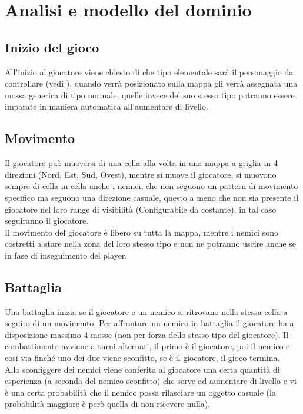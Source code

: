 \documentclass[a4paper,12pt]{report}
\begin{document}
\section{Analisi e modello del dominio}

\subsection{Inizio del gioco} \label{ss:iniziogioco}
All'inizio al giocatore viene chiesto di che tipo elementale sarà il personaggio da controllare (vedi \textit{}), quando verrà posizionato sulla mappa gli verrà assegnata una mossa generica di tipo normale, quelle invece del suo stesso tipo potranno essere imparate in maniera automatica all'aumentare di livello.\\

\subsection{Movimento}
Il giocatore può muoversi di una cella alla volta in una mappa a griglia in 4 direzioni (Nord, Est, Sud, Ovest), mentre si muove il giocatore, si muovono sempre di cella in cella anche i nemici, che non seguono un pattern di movimento specifico ma seguono una direzione casuale, questo a meno che non sia presente il giocatore nel loro range di visibilità (Configurabile da costante), in tal caso seguiranno il giocatore.\\ Il movimento del giocatore è libero su tutta la mappa, mentre i nemici sono costretti a stare nella zona del loro stesso tipo e non ne potranno uscire anche se in fase di inseguimento del player.\\

\subsection{Battaglia}
Una battaglia inizia se il giocatore e un nemico si ritrovano nella stessa cella a seguito di un movimento. Per affrontare un nemico in battaglia il giocatore ha a disposizione massimo 4 mosse (non per forza dello stesso tipo del giocatore). Il combattimento avviene a turni alternati, il primo è il giocatore, poi il nemico e così via finché uno dei due viene sconfitto, se è il giocatore, il gioco termina.\\
Allo sconfiggere dei nemici viene conferita al giocatore una certa quantità di esperienza (a seconda del nemico sconfitto) che serve ad aumentare di livello e vi è una certa probabilità che il nemico possa rilasciare un oggetto casuale (la probabilità maggiore è però quella di non ricevere nulla).
\end{document}

